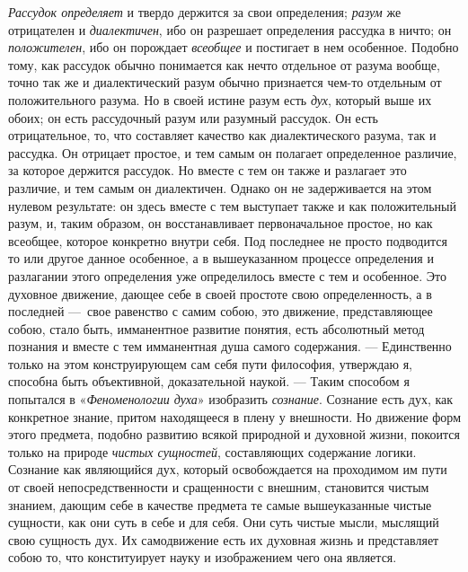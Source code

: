{\em Рассудок определяет} и твердо держится за свои
определения; {\em разум} же отрицателен и
{\em диалектичен}, ибо он разрешает определения
рассудка в ничто; он {\em положителен}, ибо он
порождает {\em всеобщее} и постигает в нем особенное.
Подобно тому, как рассудок обычно понимается как нечто отдельное от разума
вообще, точно так же и диалектический разум обычно признается чем-то
отдельным от положительного разума. Но в своей истине разум есть
{\em дух}, который выше их обоих; он есть рассудочный
разум или разумный рассудок. Он есть отрицательное, то, что составляет
качество как диалектического разума, так и рассудка. Он отрицает простое, и
тем самым он полагает определенное различие, за которое держится рассудок.
Но вместе с тем он также и разлагает это различие, и тем самым он
диалектичен. Однако он не задерживается на этом нулевом результате: он
здесь вместе с тем выступает также и как положительный разум, и, таким
образом, он восстанавливает первоначальное простое, но как всеобщее,
которое конкретно внутри себя. Под последнее не просто подводится то или
другое данное особенное, а в вышеуказанном процессе определения и
разлагании этого определения уже определилось вместе с тем и особенное. Это
духовное движение, дающее себе в своей простоте свою определенность, а в
последней —~свое равенство с самим собою, это движение, представляющее
собою, стало быть, имманентное развитие понятия, есть абсолютный метод
познания и вместе с тем имманентная душа самого содержания. — Единственно
только на этом конструирующем сам себя пути философия, утверждаю я,
способна быть объективной, доказательной наукой. — Таким способом я
попытался в «{\em Феноменологии духа}» изобразить
{\em сознание}. Сознание есть дух, как конкретное
знание, притом находящееся в плену у внешности. Но движение форм этого
предмета, подобно развитию всякой природной и духовной жизни, покоится
только на природе {\em чистых сущностей}, составляющих
содержание логики. Сознание как являющийся дух, который освобождается на
проходимом им пути от своей непосредственности и сращенности с внешним,
становится чистым знанием, дающим себе в качестве предмета те самые
вышеуказанные чистые сущности, как они суть в себе и для себя. Они суть
чистые мысли, мыслящий свою сущность дух. Их самодвижение есть их духовная
жизнь и представляет собою то, что конституирует науку и изображением чего
она является.

